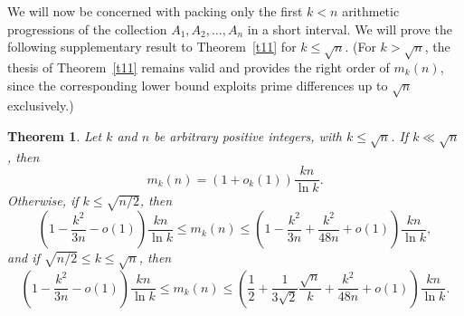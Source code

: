 \documentclass[12pt]{amsart}
\newtheorem{theorem}{Theorem}
\theoremstyle{plain}
\numberwithin{equation}{section}
\begin{document}
	We will now be concerned with packing only the first $k< n$ arithmetic progressions of the collection $A_1,A_2,\ldots, A_n$ in a short interval. 
	We will prove the following supplementary result to Theorem~\ref{t11} for $k\leqslant \sqrt{n}$. 
	(For  $k>\sqrt{n}$, the thesis of Theorem~\ref{t11} remains valid and provides the right order of $m_k(n)$, since the corresponding lower bound exploits prime differences up to $\sqrt{n}$ exclusively.)

	\begin{theorem}\label{t31}
		Let $k$ and $n$ be arbitrary positive integers, with $ k\leqslant \sqrt{n}$. If $k\ll \sqrt{n}$, then 
		$$m_k(n) = (1+o_k(1))\frac{kn}{\ln k}.$$
		Otherwise, if $k\leqslant \sqrt{n/2}$, then
		$$\left(1-\frac{k^2}{3n}-o(1)\right)\frac{kn}{\ln k} \leqslant m_k(n)\leqslant \left(1-\frac{k^2}{3n}+\frac{k^2}{48n}+o(1)\right)\frac{kn}{\ln k},$$
		and if $\sqrt{n/2} \leqslant k \leqslant \sqrt{n}$, then
		$$\left(1-\frac{k^2}{3n}-o(1)\right)\frac{kn}{\ln k} \leqslant m_k(n)\leqslant \left(\frac{1}{2}+\frac{1}{3\sqrt{2}}\frac{\sqrt{n}}{k}+\frac{k^2}{48n}+o(1)\right)\frac{kn}{\ln k}.$$
	\end{theorem}
\end{document}
